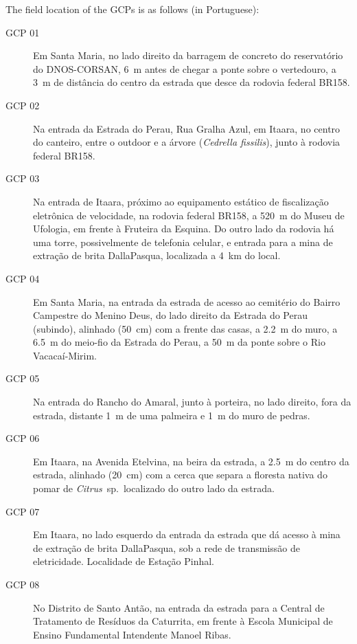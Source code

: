 The field location of the GCPs is as follows (in Portuguese):

\begin{description}
 \item [GCP 01] Em Santa Maria, no lado direito da barragem de concreto do reservatório do DNOS-CORSAN, 
 \SI{6}{\m} antes de chegar a ponte sobre o vertedouro, a \SI{3}{\m} de distância do centro da estrada que 
 desce da rodovia federal BR158.
 
 \item [GCP 02] Na entrada da Estrada do Perau, Rua Gralha Azul, em Itaara, no centro do canteiro, entre o 
 outdoor e a árvore (\textit{Cedrella fissilis}), junto à rodovia federal BR158.
 
 \item [GCP 03] Na entrada de Itaara, próximo ao equipamento estático de fiscalização eletrônica de 
 velocidade, na rodovia federal BR158, a \SI{520}{\m} do Museu de Ufologia, em frente à Fruteira da 
 Esquina. Do outro lado da rodovia há uma torre, possivelmente de telefonia celular, e entrada para a mina de 
 extração de brita DallaPasqua, localizada a \SI{4}{\km} do local.
 
 \item [GCP 04] Em Santa Maria, na entrada da estrada de acesso ao cemitério do Bairro Campestre do Menino 
 Deus, do lado direito da Estrada do Perau (subindo), alinhado (\SI{50}{\cm}) com a frente das casas, a
 \SI{2,2}{\m} do muro, a \SI{6,5}{\m} do meio-fio da Estrada do Perau, a \SI{50}{\m} da ponte sobre o Rio
 Vacacaí-Mirim.
 
 \item [GCP 05] Na entrada do Rancho do Amaral, junto à porteira, no lado direito, fora da estrada, distante 
 \SI{1}{\m} de uma palmeira e \SI{1}{\m} do muro de pedras.
 
 \item [GCP 06] Em Itaara, na Avenida Etelvina, na beira da estrada, a \SI{2,5}{\m} do centro da estrada,
 alinhado (\SI{20}{\cm}) com a cerca que separa a floresta nativa do pomar de \textit{Citrus}~sp.~localizado 
 do outro lado da estrada.
 
 \item [GCP 07] Em Itaara, no lado esquerdo da entrada da estrada que dá acesso à mina de extração de brita
 DallaPasqua, sob a rede de transmissão de eletricidade. Localidade de Estação Pinhal. 
 
 \item [GCP 08] No Distrito de Santo Antão, na entrada da estrada para a Central de Tratamento de Resíduos
 da Caturrita, em frente à Escola Municipal de Ensino Fundamental Intendente Manoel Ribas.
 

\end{description}

